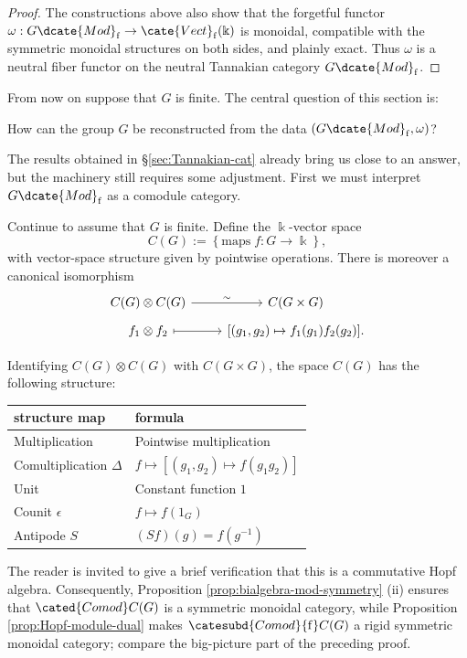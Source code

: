 \begin{proof}
	The constructions above also show that the forgetful functor $\omega:G\dcate{Mod}_{\mathrm{f}}\to\cate{Vect}_{\mathrm{f}}(\Bbbk)$ is monoidal, compatible with the symmetric monoidal structures on both sides, and plainly exact. Thus $\omega$ is a neutral fiber functor on the neutral Tannakian category $G\dcate{Mod}_{\mathrm{f}}$.
\end{proof}

From now on suppose that $G$ is finite. The central question of this section is:
\begin{center}
	How can the group $G$ be reconstructed from the data $\left(G\dcate{Mod}_{\mathrm{f}},\omega\right)$?
\end{center}
The results obtained in \S\ref{sec:Tannakian-cat} already bring us close to an answer, but the machinery still requires some adjustment. First we must interpret $G\dcate{Mod}_{\mathrm{f}}$ as a comodule category.

\begin{definition}
	Continue to assume that $G$ is finite. Define the $\Bbbk$-vector space
	\[ C(G) := \left\{\text{maps}\; f: G \to \Bbbk \right\}, \]
	with vector-space structure given by pointwise operations. There is moreover a canonical isomorphism
	\[\begin{tikzcd}[row sep=tiny]
		C(G) \otimes C(G) \arrow[r, "\sim"] & C(G \times G) \\
		f_1 \otimes f_2 \arrow[mapsto, r] & {[(g_1, g_2) \mapsto f_1(g_1) f_2(g_2)]}.
	\end{tikzcd}\]
\end{definition}

Identifying $C(G)\otimes C(G)$ with $C(G\times G)$, the space $C(G)$ has the following structure:
\begin{center}\begin{tabular}{|l|p{}|} \hline
	structure map & formula \\ \hline
	Multiplication & Pointwise multiplication \\ \hline
	Comultiplication $\Delta$ & $f\mapsto[(g_1,g_2)\mapsto f(g_1g_2)]$ \\ \hline
	Unit & Constant function $1$ \\ \hline
	Counit $\epsilon$ & $f\mapsto f(1_G)$ \\ \hline
	Antipode $S$ & $(Sf)(g)=f(g^{-1})$ \\ \hline
\end{tabular}\end{center}
The reader is invited to give a brief verification that this is a commutative Hopf algebra. Consequently, Proposition \ref{prop:bialgebra-mod-symmetry} (ii) ensures that $\cated{Comod}C(G)$ is a symmetric monoidal category, while Proposition \ref{prop:Hopf-module-dual} makes $\catesubd{Comod}{\mathrm{f}}C(G)$ a rigid symmetric monoidal category; compare the big-picture part of the preceding proof.

